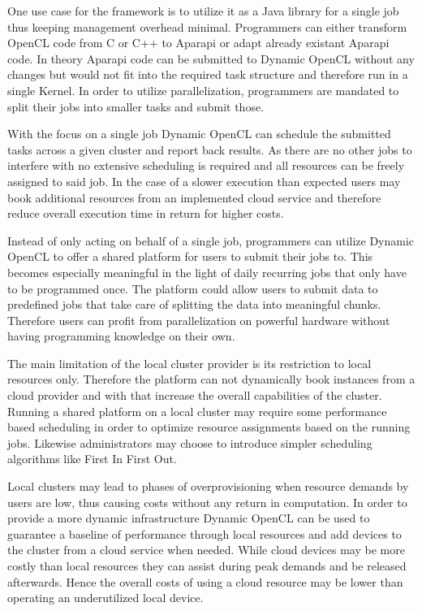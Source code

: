 \begin{description}[style=nextline]
	\item[Job Based Library]
	One use case for the framework is to utilize it as a Java library for a single job thus keeping management overhead minimal. Programmers can either transform OpenCL code from C or C++ to Aparapi or adapt already existant Aparapi code. In theory Aparapi code can be submitted to Dynamic OpenCL without any changes but would not fit into the required task structure and therefore run in a single Kernel. In order to utilize parallelization, programmers are mandated to split their jobs into smaller tasks and submit those.
	
	With the focus on a single job Dynamic OpenCL can schedule the submitted tasks across a given cluster and report back results. As there are no other jobs to interfere with no extensive scheduling is required and all resources can be freely assigned to said job. In the case of a slower execution than expected users may book additional resources from an implemented cloud service and therefore reduce overall execution time in return for higher costs.
	
	\item[Local Cluster Provider] 
	
	Instead of only acting on behalf of a single job, programmers can utilize Dynamic OpenCL to offer a shared platform for users to submit their jobs to. This becomes especially meaningful in the light of daily recurring jobs that only have to be programmed once. The platform could allow users to submit data to predefined jobs that take care of splitting the data into meaningful chunks. Therefore users can profit from parallelization on powerful hardware without having programming knowledge on their own.
	
	The main limitation of the local cluster provider is its restriction to local resources only. Therefore the platform can not dynamically book instances from a cloud provider and with that increase the overall capabilities of the cluster. Running a shared platform on a local cluster may require some performance based scheduling in order to optimize resource assignments based on the running jobs. Likewise administrators may choose to introduce simpler scheduling algorithms like First In First Out. 
	
	\item[Hybrid Cloud Provider] 
	Local clusters may lead to phases of overprovisioning when resource demands by users are low, thus causing costs without any return in computation. In order to provide a more dynamic infrastructure Dynamic OpenCL can be used to guarantee a baseline of performance through local resources and add devices to the cluster from a cloud service when needed. While cloud devices may be more costly than local resources they can assist during peak demands and be released afterwards. Hence the overall costs of using a cloud resource may be lower than operating an underutilized local device.
	

\end{description}
